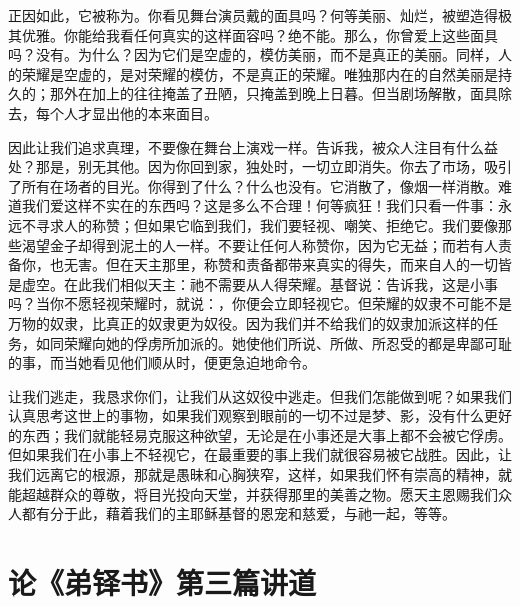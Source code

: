正因如此，它被称为。你看见舞台演员戴的面具吗？何等美丽、灿烂，被塑造得极其优雅。你能给我看任何真实的这样面容吗？绝不能。那么，你曾爱上这些面具吗？没有。为什么？因为它们是空虚的，模仿美丽，而不是真正的美丽。同样，人的荣耀是空虚的，是对荣耀的模仿，不是真正的荣耀。唯独那内在的自然美丽是持久的；那外在加上的往往掩盖了丑陋，只掩盖到晚上日暮。但当剧场解散，面具除去，每个人才显出他的本来面目。\par

因此让我们追求真理，不要像在舞台上演戏一样。告诉我，被众人注目有什么益处？那是，别无其他。因为你回到家，独处时，一切立即消失。你去了市场，吸引了所有在场者的目光。你得到了什么？什么也没有。它消散了，像烟一样消散。难道我们爱这样不实在的东西吗？这是多么不合理！何等疯狂！我们只看一件事：永远不寻求人的称赞；但如果它临到我们，我们要轻视、嘲笑、拒绝它。我们要像那些渴望金子却得到泥土的人一样。不要让任何人称赞你，因为它无益；而若有人责备你，也无害。但在天主那里，称赞和责备都带来真实的得失，而来自人的一切皆是虚空。在此我们相似天主：祂不需要从人得荣耀。基督说：告诉我，这是小事吗？当你不愿轻视荣耀时，就说：，你便会立即轻视它。但荣耀的奴隶不可能不是万物的奴隶，比真正的奴隶更为奴役。因为我们并不给我们的奴隶加派这样的任务，如同荣耀向她的俘虏所加派的。她使他们所说、所做、所忍受的都是卑鄙可耻的事，而当她看见他们顺从时，便更急迫地命令。\par

让我们逃走，我恳求你们，让我们从这奴役中逃走。但我们怎能做到呢？如果我们认真思考这世上的事物，如果我们观察到眼前的一切不过是梦、影，没有什么更好的东西；我们就能轻易克服这种欲望，无论是在小事还是大事上都不会被它俘虏。但如果我们在小事上不轻视它，在最重要的事上我们就很容易被它战胜。因此，让我们远离它的根源，那就是愚昧和心胸狭窄，这样，如果我们怀有崇高的精神，就能超越群众的尊敬，将目光投向天堂，并获得那里的美善之物。愿天主恩赐我们众人都有分于此，藉着我们的主耶稣基督的恩宠和慈爱，与祂一起，等等。\par



\section{论《弟铎书》第三篇讲道}

